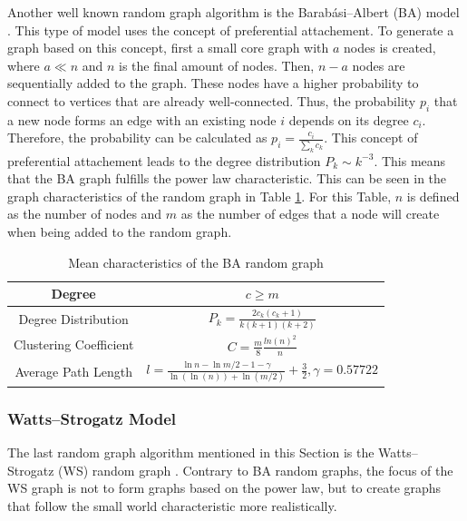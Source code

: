 Another well known random graph algorithm is the Barabási–Albert (BA) model 
\cite{barabasimodel}. 
This type of model uses the concept of preferential attachement.
To generate a graph based on this concept, first a small \glqq core\grqq{}
graph with $a$ nodes is created, where $a\ll n$ and $n$ is the final amount of nodes.
Then, $n-a$ nodes are sequentially added to the graph.
These nodes have a higher 
probability to connect to vertices that are already well-connected. 
Thus, the probability $p_i$ that a new node forms an edge with an
existing node $i$ depends on its degree $c_i$. Therefore, the
probability can be calculated as $p_i= \frac{c_i}{\sum_{k}c_k}$.
This concept of preferential attachement leads to the degree distribution
$P_k\sim k^{-3}$. This means that the BA graph 
fulfills the power law characteristic.
This can be seen in the graph characteristics of the random graph
in Table \ref{ba-model}. For this Table, $n$ is defined as the number
of nodes and $m$ as the number of edges that a node
will create when being added to the random graph.

\begin{table}[ht!]
    \centering
    \begin{tabular}{|c | c |} 
     \hline
     Degree & $c\geq m$ \\ 
     \hline
     Degree Distribution & 
     $P_k = \frac{2c_k(c_k+1)}{k(k+1)(k+2)}$ \\ 
     \hline
     Clustering Coefficient \cite{ba_cluster_coeff} & 
     $C=\frac{m}{8}\frac{ln(n)^2}{n}$ \\ 
     \hline
     Average Path Length \cite{averagepath}& 
     $l = \frac{\ln{n}- \ln{m/2} - 1 - \gamma}{\ln(\ln(n))+\ln{(m/2)}} + \frac{3}{2}, 
     \gamma=0.57722$ \\ 
     \hline
    \end{tabular}
    \caption{Mean characteristics of the BA random graph \cite{basicnetwork}}
    \label{ba-model}
\end{table}

\subsubsection{Watts–Strogatz Model}
The last random graph algorithm mentioned in this Section 
is the Watts–Strogatz (WS) random graph \cite{wattsmodel}.
Contrary to BA random graphs, the focus of the WS graph is not to 
form graphs based on the power law, but to create graphs
that follow the small world characteristic more realistically.

